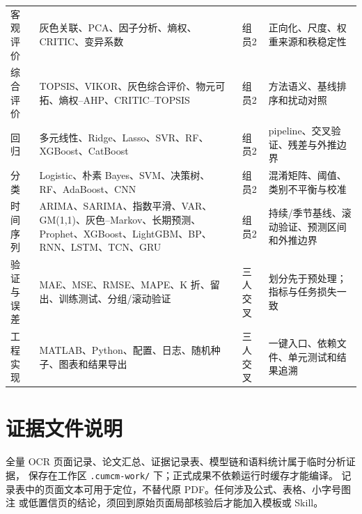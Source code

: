 \documentclass[UTF8,a4paper,12pt]{ctexart}
\begin{document}
\begin{longtable}{p{2.1cm}p{5.0cm}p{2.0cm}p{5.5cm}}
客观评价 & 灰色关联、PCA、因子分析、熵权、CRITIC、变异系数 & 组员2 & 正向化、尺度、权重来源和秩稳定性\\
综合评价 & TOPSIS、VIKOR、灰色综合评价、物元可拓、熵权--AHP、CRITIC--TOPSIS & 组员2 & 方法语义、基线排序和扰动对照\\
回归 & 多元线性、Ridge、Lasso、SVR、RF、XGBoost、CatBoost & 组员2 & pipeline、交叉验证、残差与外推边界\\
分类 & Logistic、朴素 Bayes、SVM、决策树、RF、AdaBoost、CNN & 组员2 & 混淆矩阵、阈值、类别不平衡与校准\\
时间序列 & ARIMA、SARIMA、指数平滑、VAR、GM(1,1)、灰色--Markov、长期预测、Prophet、XGBoost、LightGBM、BP、RNN、LSTM、TCN、GRU & 组员2 & 持续/季节基线、滚动验证、预测区间和外推边界\\
验证与误差 & MAE、MSE、RMSE、MAPE、K 折、留出、训练测试、分组/滚动验证 & 三人交叉 & 划分先于预处理；指标与任务损失一致\\
工程实现 & MATLAB、Python、配置、日志、随机种子、图表和结果导出 & 三人交叉 & 一键入口、依赖文件、单元测试和结果追溯\\
\bottomrule
\end{longtable}

\section{证据文件说明}

全量 OCR 页面记录、论文汇总、证据记录表、模型链和语料统计属于临时分析证据，
保存在工作区 \texttt{.cumcm-work/} 下；正式成果不依赖运行时缓存才能编译。
记录表中的页面文本可用于定位，不替代原 PDF。任何涉及公式、表格、小字号图注
或低置信页的结论，须回到原始页面局部核验后才能加入模板或 Skill。
\end{document}
